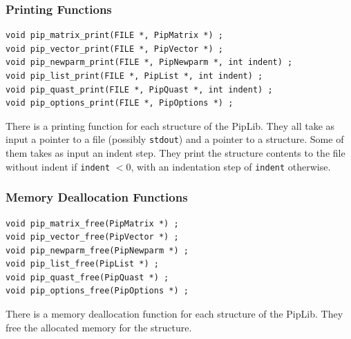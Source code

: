 \documentclass[12pt,a4paper]{article}
\begin{document}
\subsubsection{Printing Functions}
\begin{verbatim}
void pip_matrix_print(FILE *, PipMatrix *) ;
void pip_vector_print(FILE *, PipVector *) ;
void pip_newparm_print(FILE *, PipNewparm *, int indent) ;
void pip_list_print(FILE *, PipList *, int indent) ;
void pip_quast_print(FILE *, PipQuast *, int indent) ;
void pip_options_print(FILE *, PipOptions *) ;
\end{verbatim}
There is a printing function for each structure of the PipLib. They all take as input
a pointer to a file (possibly {\tt stdout}) and a pointer to a structure.
Some of them takes as input an
indent step. They print the structure contents to the file without indent if
{\tt indent} $< 0$, with an indentation step of {\tt indent} otherwise.

\subsubsection{Memory Deallocation Functions}
\begin{verbatim}
void pip_matrix_free(PipMatrix *) ;
void pip_vector_free(PipVector *) ;
void pip_newparm_free(PipNewparm *) ;
void pip_list_free(PipList *) ;
void pip_quast_free(PipQuast *) ;
void pip_options_free(PipOptions *) ;
\end{verbatim}
There is a memory deallocation function for each structure of the PipLib.
They free the allocated memory for the structure.
\end{document}
